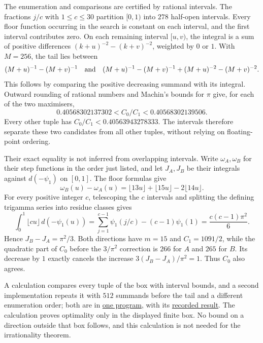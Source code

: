 The enumeration and comparisons are certified by rational intervals.
The fractions $j/c$ with $1\le c\le30$ partition $[0,1)$ into $278$
half-open intervals. Every floor function occurring in the search is
constant on each interval, and the first interval contributes zero. On each remaining interval $[u,v)$,
the integral is a sum of positive differences
$(k+u)^{-2}-(k+v)^{-2}$, weighted by $0$ or $1$. With $M=256$, the tail
lies between
\[
 (M+u)^{-1}-(M+v)^{-1}
 \quad\hbox{and}\quad
 (M+u)^{-1}-(M+v)^{-1}+(M+u)^{-2}-(M+v)^{-2}.
\]
This follows by comparing the positive decreasing summand with its
integral. Outward rounding of rational numbers and Machin's bounds for
$\pi$ give, for each of the two maximisers,
\[
 0.40568302137302<C_0/C_1<0.40568302139506.
\]
Every other tuple has $C_0/C_1<0.40563943278333$. The intervals therefore
separate these two candidates from all other tuples, without relying
on floating-point ordering.

Their exact equality is not inferred from overlapping intervals.
Write $\omega_A,\omega_B$ for their step functions in the order just
listed, and let $J_A,J_B$ be their integrals against $d(-\psi_1)$
on $[0,1]$. The floor formulas give
\[
 \omega_B(u)-\omega_A(u)
 =\lfloor13u\rfloor+\lfloor15u\rfloor-2\lfloor14u\rfloor.
\]
For every positive integer $c$, telescoping the $c$ intervals and
splitting the defining trigamma series into residue classes gives
\[
 \int_0^1\lfloor cu\rfloor\,d(-\psi_1(u))
 =\sum_{j=1}^{c-1}\psi_1(j/c)-(c-1)\psi_1(1)
 =\frac{c(c-1)\pi^2}{6}.
\]
Hence $J_B-J_A=\pi^2/3$. Both directions have $m=15$ and
$C_1=1091/2$, while the quadratic part of $C_0$ before the $3/\pi^2$ correction is
$266$ for $A$ and $265$ for $B$. Its decrease by $1$ exactly cancels
the increase $3(J_B-J_A)/\pi^2=1$. Thus $C_0$ also agrees.

A calculation compares every tuple of the box with interval bounds,
and a second implementation repeats it with $512$ summands before the
tail and a different enumeration order; both are in
\href{https://github.com/wcook04/plectis-erdos/blob/4beca4ad0c00a626def9c73f2420e20ebf8d1968/research/experiments/erdos1049/parameter_box.py}{one program}, with its \href{https://github.com/wcook04/plectis-erdos/blob/4beca4ad0c00a626def9c73f2420e20ebf8d1968/research/experiments/erdos1049/receipts/parameter-box.json}{recorded result}.
The calculation proves optimality only in the displayed finite box. No
bound on a direction outside that box follows, and this calculation
is not needed for the irrationality theorem.

